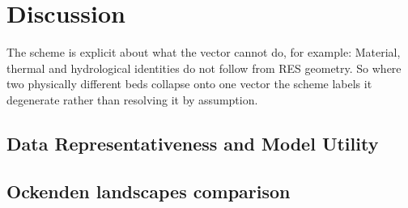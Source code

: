 \chapter{Discussion}\label{discussion}

The scheme is explicit about what the vector cannot do, for example: Material, thermal and hydrological identities do not follow from RES geometry. So where two physically different beds collapse onto one vector the scheme labels it degenerate rather than resolving it by assumption. 


\section{Data Representativeness and Model Utility}


\section{Ockenden landscapes comparison}



